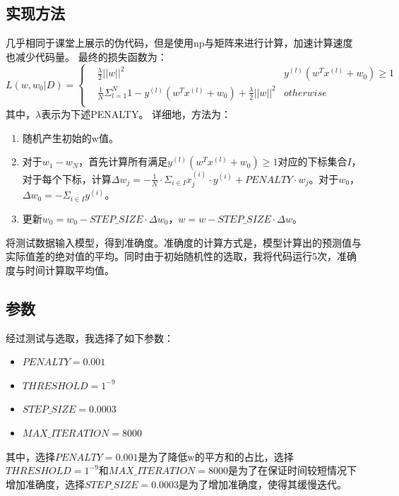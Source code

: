 \documentclass[UTF8]{ctexart}
\begin{document}
\subsection{实现方法}
几乎相同于课堂上展示的伪代码，但是使用np与矩阵来进行计算，加速计算速度也减少代码量。
最终的损失函数为：
$$L(w,w_0|D)=\left\{
    \begin{aligned}
&\frac{\lambda}{2} ||w||^2 &y^{(l)}(w^Tx^{(l)}+w_0)\geq 1\\
&\frac{1}{N}\Sigma_{l=1}^N 1-y^{(l)}(w^Tx^{(l)}+w_0)+\frac{\lambda}{2} ||w||^2 & otherwise\\
\end{aligned}
\right.$$
其中，$\lambda$表示为下述PENALTY。
详细地，方法为：
\begin{enumerate}
    \item 随机产生初始的w值。
    \item 对于$w_1-w_N$，首先计算所有满足$y^{(l)}(w^Tx^{(l)}+w_0)\geq 1$对应的下标集合$I$，对于每个下标，计算$\Delta w_j=-\frac{1}{N} \cdot \Sigma_{i \in I}x_j^{(i)}\cdot y^{(i)}+PENALTY \cdot w_j$。对于$w_0$，$\Delta w_0 = -\Sigma_{i \in I}y^{(i)}$。
    \item 更新$w_0=w_0-STEP\_SIZE \cdot \Delta w_0$，$w=w-STEP\_SIZE \cdot \Delta w$。
\end{enumerate}
将测试数据输入模型，得到准确度。准确度的计算方式是，模型计算出的预测值与实际值差的绝对值的平均。同时由于初始随机性的选取，我将代码运行5次，准确度与时间计算取平均值。
\subsection{参数}
经过测试与选取，我选择了如下参数：
\begin{itemize}
    \item $PENALTY = 0.001$
    \item $THRESHOLD = 1^{-9}$
    \item $STEP\_SIZE = 0.0003$
    \item $MAX\_ITERATION = 8000$
\end{itemize}
其中，选择$PENALTY = 0.001$是为了降低w的平方和的占比，选择$THRESHOLD = 1^{-9}$和$MAX\_ITERATION = 8000$是为了在保证时间较短情况下增加准确度，选择$STEP\_SIZE = 0.0003$是为了增加准确度，使得其缓慢迭代。
\end{document}
